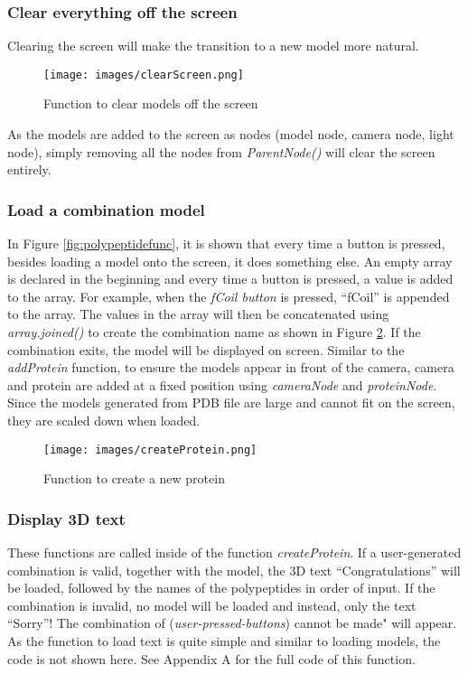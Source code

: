 \subsubsection{Clear everything off the screen}
Clearing the screen will make the transition to a new model more natural. 
\begin{figure}[!htp]
	\centering
	\texttt{[image: images/clearScreen.png]}
	\caption{Function to clear models off the screen}
	\label{fig:clearScreen}
\end{figure}

As the models are added to the screen as nodes (model node, camera node, light node), simply removing all the nodes from \emph{ParentNode()} will clear the screen entirely.

\subsubsection{Load a combination model}
In Figure \ref{fig:polypeptidefunc}, it is shown that every time a button is pressed, besides loading a model onto the screen, it does something else. An empty array is declared in the beginning and every time a button is pressed, a value is added to the array. For example, when the \emph{fCoil button} is pressed, “fCoil” is appended to the array. The values in the array will then be concatenated using \emph{array.joined()} to create the combination name as shown in Figure \ref{fig:createProtein}. 
If the combination exits, the model will be displayed on screen. Similar to the \emph{addProtein} function, to ensure the models appear in front of the camera, camera and protein are added at a fixed position using \emph{cameraNode} and \emph{proteinNode}. Since the models generated from PDB file are large and cannot fit on the screen, they are scaled down when loaded. 

\begin{figure}[!htp]
	\centering
	\texttt{[image: images/createProtein.png]}
	\caption{Function to create a new protein}
	\label{fig:createProtein}
\end{figure}

\subsubsection{Display 3D text}
These functions are called inside of the function \emph{createProtein}. If a user-generated combination is valid, together with the model, the 3D text “Congratulations” will be loaded, followed by the names of the polypeptides in order of input. If the combination is invalid, no model will be loaded and instead, only the text “Sorry”! The combination of (\emph{user-pressed-buttons}) cannot be made" will appear. As the function to load text is quite simple and similar to loading models, the code is not shown here. See Appendix A for the full code of this function. 

